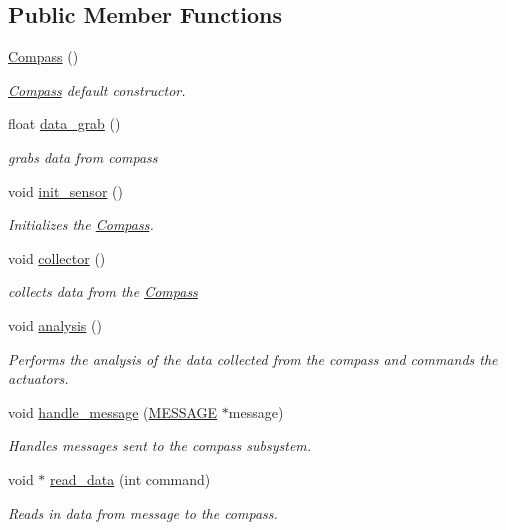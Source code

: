 \subsection*{Public Member Functions}
\begin{DoxyCompactItemize}
\item 
\hyperlink{classCompass_a68bd2a073cc0d461b2b46529aae04765}{Compass} ()
\begin{DoxyCompactList}\small\item\em \hyperlink{classCompass}{Compass} default constructor. \end{DoxyCompactList}\item 
float \hyperlink{classCompass_aa4132c05a4e20e95633c72776385bc42}{data\-\_\-grab} ()
\begin{DoxyCompactList}\small\item\em grabs data from compass \end{DoxyCompactList}\item 
void \hyperlink{classCompass_a5cc2b71700af542b5aafadea4820a476}{init\-\_\-sensor} ()
\begin{DoxyCompactList}\small\item\em Initializes the \hyperlink{classCompass}{Compass}. \end{DoxyCompactList}\item 
void \hyperlink{classCompass_ae8d7f3417a27b1d18487b96ca07dd32b}{collector} ()
\begin{DoxyCompactList}\small\item\em collects data from the \hyperlink{classCompass}{Compass} \end{DoxyCompactList}\item 
void \hyperlink{classCompass_a4dd6402d0ece9203c6b92670265b4c8d}{analysis} ()
\begin{DoxyCompactList}\small\item\em Performs the analysis of the data collected from the compass and commands the actuators. \end{DoxyCompactList}\item 
void \hyperlink{classCompass_a1fb0f64b335e8f1d4f27dc2067312b4a}{handle\-\_\-message} (\hyperlink{SUBSYS__COMMANDS_8h_ad814416fc1a8c675bea2687d96088a8f}{M\-E\-S\-S\-A\-G\-E} $\ast$message)
\begin{DoxyCompactList}\small\item\em Handles messages sent to the compass subsystem. \end{DoxyCompactList}\item 
void $\ast$ \hyperlink{classCompass_ab55d084e2d643df0a1970f5868d0c5a8}{read\-\_\-data} (int command)
\begin{DoxyCompactList}\small\item\em Reads in data from message to the compass. \end{DoxyCompactList}\end{DoxyCompactItemize}

